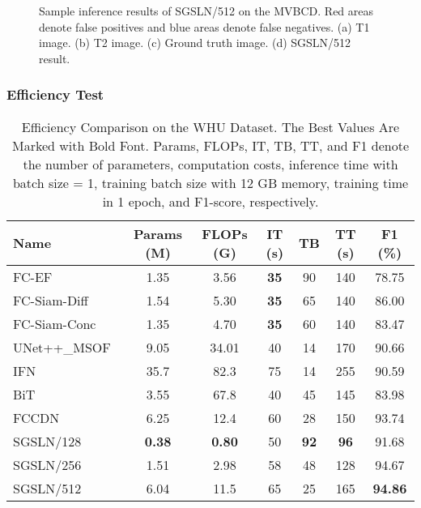 \documentclass[journal]{IEEEtran}
\begin{document}
\begin{figure}[!ht] \centering
{}
\caption{Sample inference results of SGSLN/512 on the MVBCD. Red areas denote false positives and blue areas denote false negatives. (a) T1 image. (b) T2 image. (c) Ground truth image. (d) SGSLN/512 result.}
\label{Fig:njds_result}
\end{figure}


\subsubsection{Efficiency Test}
\label{section:4.4.5}

\begin{table*}[!ht]
\caption{Efficiency Comparison on the WHU Dataset. The Best Values Are Marked with Bold Font. Params, FLOPs, IT, TB, TT, and F1 denote the number of parameters, computation costs, inference time with batch size = 1, training batch size with 12 GB memory, training time in 1 epoch, and F1-score, respectively.}
\label{efficiency}
\centering
\begin{tabular}{lcccccc}
\toprule
Name & Params (M) & FLOPs (G) & IT (s) & TB & TT (s) & F1 (\%) \\
\midrule
FC-EF~\cite{fcef} & 1.35 & 3.56 & \textbf{35} & 90 & 140 & 78.75\\
FC-Siam-Diff~\cite{fcef} & 1.54 & 5.30 & \textbf{35} & 65 & 140 & 86.00\\
FC-Siam-Conc~\cite{fcef} & 1.35 & 4.70 & \textbf{35} & 60 & 140 & 83.47\\
UNet++\_MSOF~\cite{etecd} & 9.05 & 34.01 & 40 & 14 & 170 & 90.66\\
IFN~\cite{dsifn} & 35.7 & 82.3 & 75 & 14 & 255 & 90.59\\
BiT~\cite{bit} & 3.55 & 67.8 & 40 & 45 & 145 & 83.98\\
FCCDN~\cite{fccdn} & 6.25 & 12.4 & 60 & 28 & 150 & 93.74\\
SGSLN/128 & \textbf{0.38} & \textbf{0.80} & 50 & \textbf{92} & \textbf{96} & 91.68\\
SGSLN/256 & 1.51 & 2.98 & 58 & 48 & 128 & 94.67\\
SGSLN/512 & 6.04 & 11.5 & 65 & 25 & 165 & \textbf{94.86}\\
\bottomrule
\end{tabular}
\end{table*}
\end{document}
